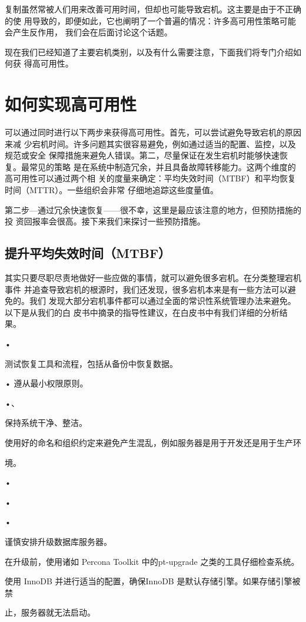 复制虽然常被人们用来改善可用时间，但却也可能导致宕机。这主要是由于不正确的使
用导致的，即便如此，它也阐明了一个普遍的情况：许多高可用性策略可能会产生反作用，
我们会在后面讨论这个话题。

现在我们已经知道了主要宕机类别，以及有什么需要注意，下面我们将专门介绍如何获
得高可用性。

\section{如何实现高可用性}
可以通过同时进行以下两步来获得高可用性。首先，可以尝试避免导致宕机的原因来减
少宕机时间。许多问题其实很容易避免，例如通过适当的配置、监控，以及规范或安全
保障措施来避免人错误。第二，尽量保证在发生宕机时能够快速恢复。最常见的策略
是在系统中制造冗余，并且具备故障转移能力。这两个维度的高可用性可以通过两个相
关的度量来确定：平均失效时间（MTBF）和平均恢复时间（MTTR）。一些组织会非常
仔细地追踪这些度量值。

第二步—通过冗余快速恢复——很不幸，这里是最应该注意的地方，但预防措施的投
资回报率会很高。接下来我们来探讨一些预防措施。

\subsection{提升平均失效时间（MTBF）}
其实只要尽职尽责地做好一些应做的事情，就可以避免很多宕机。在分类整理宕机事件
并追查导致宕机的根源时，我们还发现，很多宕机本来是有一些方法可以避免的。我们
发现大部分宕机事件都可以通过全面的常识性系统管理办法来避免。以下是从我们的白
皮书中摘录的指导性建议，在白皮书中有我们详细的分析结果。

•

测试恢复工具和流程，包括从备份中恢复数据。

• 遵从最小权限原则。

•、

保持系统干净、整洁。

使用好的命名和组织约定来避免产生混乱，例如服务器是用于开发还是用于生产环

境。

•

•

•

谨慎安排升级数据库服务器。

在升级前，使用诸如 Percona Toolkit 中的pt-upgrade 之类的工具仔细检查系统。

使用 InnoDB 并进行适当的配置，确保InnoDB 是默认存储引擎。如果存储引擎被禁

止，服务器就无法启动。


